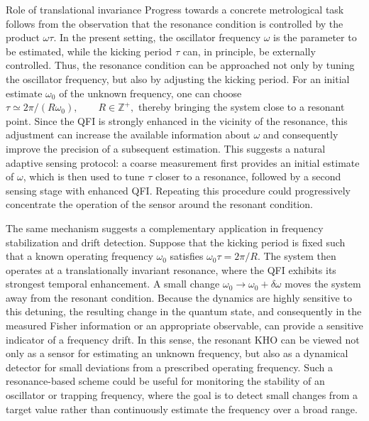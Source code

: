 \documentclass[amsmath,nobibnotes,aps,amssymb,pra, prl,aps,showpacs,superscriptaddress,twocolumn, longbibliography, reprint]{revtex4-2}
\begin{document}
\begin{section}{Role of translational invariance}
Progress towards a concrete metrological task follows from the observation that the resonance condition is controlled by the product $\omega\tau$. In the present setting, the oscillator frequency $\omega$ is the parameter to be estimated, while the kicking period $\tau$ can, in principle, be externally controlled. Thus, the resonance condition can be approached not only by tuning the oscillator frequency, but also by adjusting the kicking period. For an initial estimate $\omega_0$ of the unknown frequency, one can choose
$\tau \simeq 2\pi/(R\omega_0),
\qquad R\in\mathbb{Z}^{+},$
thereby bringing the system close to a resonant point. Since the QFI is strongly enhanced in the vicinity of the resonance, this adjustment can increase the available information about $\omega$ and consequently improve the precision of a subsequent estimation. This suggests a natural adaptive sensing protocol: a coarse measurement first provides an initial estimate of $\omega$, which is then used to tune $\tau$ closer to a resonance, followed by a second sensing stage with enhanced QFI. Repeating this procedure could progressively concentrate the operation of the sensor around the resonant condition.

The same mechanism suggests a complementary application in frequency stabilization and drift detection. Suppose that the kicking period is fixed such that a known operating frequency $\omega_0$ satisfies
$\omega_0\tau=2\pi/R $.
The system then operates at a translationally invariant resonance, where the QFI exhibits its strongest temporal enhancement. A small change $\omega_0\rightarrow\omega_0+\delta\omega$ moves the system away from the resonant condition. Because the dynamics are highly sensitive to this detuning, the resulting change in the quantum state, and consequently in the measured Fisher information or an appropriate observable, can provide a sensitive indicator of a frequency drift. In this sense, the resonant KHO can be viewed not only as a sensor for estimating an unknown frequency, but also as a dynamical detector for small deviations from a prescribed operating frequency. Such a resonance-based scheme could be useful for monitoring the stability of an oscillator or trapping frequency, where the goal is to detect small changes from a target value rather than continuously estimate the frequency over a broad range.



\end{section}
\end{document}
